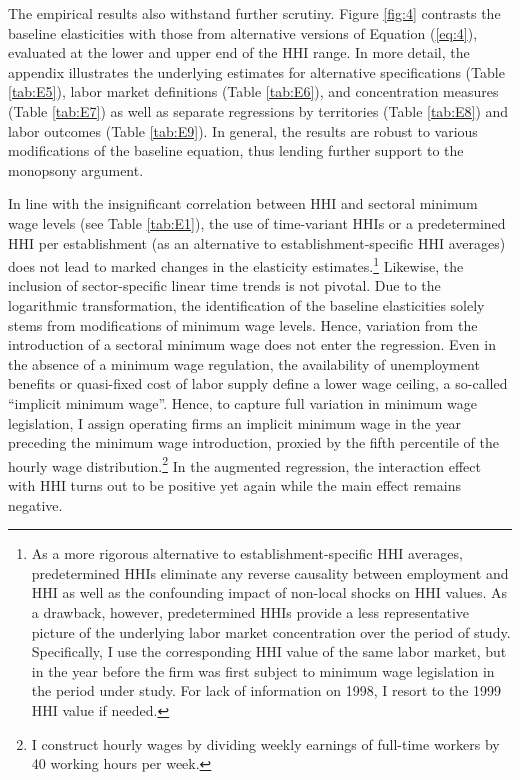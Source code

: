 \documentclass[11pt,oneside,reqno,xcolor=dvipsnames]{article} %
\begin{document}
The empirical results also withstand further scrutiny. Figure \ref{fig:4} contrasts the baseline elasticities with those from alternative versions of Equation (\ref{eq:4}), evaluated at the lower and upper end of the HHI range. In more detail, the appendix illustrates the underlying estimates for alternative specifications (Table \ref{tab:E5}), labor market definitions (Table \ref{tab:E6}), and concentration measures (Table \ref{tab:E7}) as well as separate regressions by territories (Table \ref{tab:E8}) and labor outcomes (Table \ref{tab:E9}). In general, the results are robust to various modifications of the baseline equation, thus lending further support to the monopsony argument.

In line with the insignificant correlation between HHI and sectoral minimum wage levels (see Table \ref{tab:E1}), the use of time-variant HHIs or a predetermined HHI per establishment (as an alternative to establishment-specific HHI averages) does not lead to marked changes in the elasticity estimates.\footnote{As a more rigorous alternative to establishment-specific HHI averages, predetermined HHIs eliminate any reverse causality between employment and HHI as well as the confounding impact of non-local shocks on HHI values. As a drawback, however, predetermined HHIs provide a less representative picture of the underlying labor market concentration over the period of study. Specifically, I use the corresponding HHI value of the same labor market, but in the year before the firm was first subject to minimum wage legislation in the period under study. For lack of information on 1998, I resort to the 1999 HHI value if needed.} Likewise, the inclusion of sector-specific linear time trends is not pivotal. Due to the logarithmic transformation, the identification of the baseline elasticities solely stems from modifications of minimum wage levels. Hence, variation from the introduction of a sectoral minimum wage does not enter the regression. Even in the absence of a minimum wage regulation, the availability of unemployment benefits or quasi-fixed cost of labor supply define a lower wage ceiling, a so-called ``implicit minimum wage''. Hence, to capture full variation in minimum wage legislation, I assign operating firms an implicit minimum wage in the year preceding the minimum wage introduction, proxied by the fifth percentile of the hourly wage distribution.\footnote{I construct hourly wages by dividing weekly earnings of full-time workers by 40 working hours per week.} In the augmented regression, the interaction effect with HHI turns out to be positive yet again while the main effect remains negative.
\end{document}
